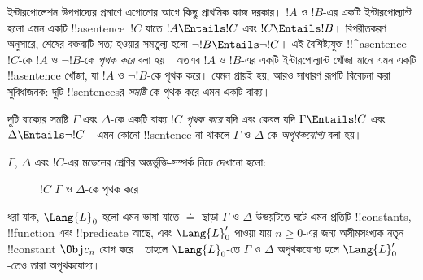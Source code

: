 \documentclass[../../../include/open-logic-section]{subfiles}
\begin{document}


ইন্টারপোলেশন উপপাদ্যের প্রমাণে এগোনোর আগে কিছু প্রাথমিক কাজ দরকার।
$!A$ ও $!B$-এর একটি ইন্টারপোল্যান্ট হলো এমন একটি !!a{sentence}~$!C$ যাতে
$!A \Entails !C$ এবং $!C \Entails !B$। বিপরীতকরণ অনুসারে, শেষের
বক্তব্যটি সত্য হওয়ার সমতুল্য হলো $\lnot !B \Entails \lnot !C$।
এই বৈশিষ্ট্যযুক্ত !!^a{sentence}~$!C$-কে $!A$ ও $\lnot !B$-কে
\emph{পৃথক করে} বলা হয়। অতএব $!A$ ও $!B$-এর একটি ইন্টারপোল্যান্ট খোঁজা
মানে এমন একটি !!a{sentence} খোঁজা, যা $!A$ ও $\lnot !B$-কে পৃথক করে।
যেমন প্রায়ই হয়, আরও সাধারণ রূপটি বিবেচনা করা সুবিধাজনক: দুটি
!!{sentence}sর \emph{সমষ্টি}-কে পৃথক করে এমন একটি বাক্য।

\begin{defn}
দুটি বাক্যের সমষ্টি $\Gamma$ এবং $\Delta$-কে একটি বাক্য $!C$
\emph{পৃথক করে} যদি এবং কেবল যদি $\Gamma \Entails !C$ এবং
$\Delta \Entails \lnot !C$। এমন কোনো !!{sentence} না থাকলে
$\Gamma$ ও $\Delta$-কে \emph{অপৃথকযোগ্য} বলা হয়।
\end{defn}

$\Gamma$, $\Delta$ এবং $!C$-এর মডেলের শ্রেণির অন্তর্ভুক্তি-সম্পর্ক
নিচে দেখানো হলো:
\begin{figure}[h]
  \centering
  \caption{$!C$ $\Gamma$ ও $\Delta$-কে পৃথক করে}
\end{figure}


\begin{lem}
ধরা যাক, $\Lang{L}_0$ হলো এমন ভাষা যাতে $\doteq$ ছাড়া
$\Gamma$ ও $\Delta$ উভয়টিতে ঘটে এমন প্রতিটি !!{constant}s,
!!{function} এবং !!{predicate} আছে, এবং $\Lang{L}'_0$ পাওয়া যায়
$n \ge 0$-এর জন্য অসীমসংখ্যক নতুন !!{constant} $\Obj c_n$ যোগ করে।
তাহলে $\Lang{L}_0$-তে $\Gamma$ ও $\Delta$ অপৃথকযোগ্য হলে
$\Lang{L}'_0$-তেও তারা অপৃথকযোগ্য।
\end{lem}
\end{document}
